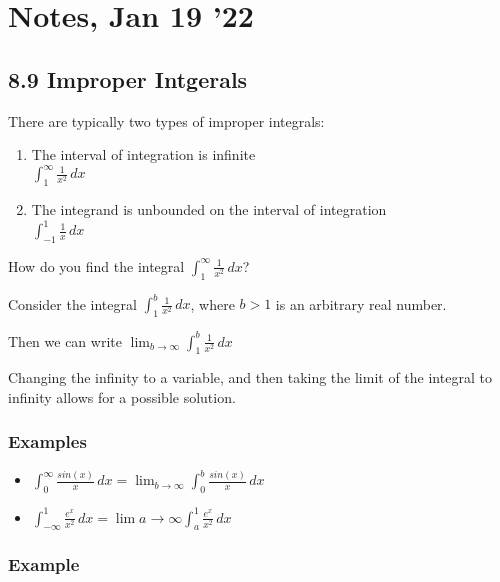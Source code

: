 \documentclass[12pt]{article}
\begin{document}
\section*{Notes, Jan 19 '22}

\subsection*{8.9 Improper Intgerals}

There are typically two types of improper integrals:

\begin{enumerate}

    \item The interval of integration is infinite \\
    $ \int_{1}^{\infty} \frac{1}{x^2} \,dx $

    \item The integrand is unbounded on the interval of integration \\
    $ \int_{-1}^{1} \frac{1}{x} \,dx $

\end{enumerate}

How do you find the integral $\int_{1}^{\infty} \frac{1}{x^2} \,dx$?

Consider the integral $\int_{1}^{b} \frac{1}{x^2} \,dx$, where $b > 1$ is an arbitrary real number.

Then we can write $\lim_{b\to\infty} \int_{1}^{b} \frac{1}{x^2} \,dx $

Changing the infinity to a variable, and then taking the limit of the integral to infinity allows for a possible solution.

\subsubsection*{Examples}

\begin{itemize}

    \item $ \int_{0}^{\infty} \frac{sin(x)}{x} \,dx = \lim_{b\to\infty} \int_{0}^{b} \frac{sin(x)}{x} \,dx $

    \item $ \int_{-\infty}^{1} \frac{e^x}{x^2} \,dx = \lim{a\to\infty} \int_{a}^{1} \frac{e^x}{x^2} \,dx $

\end{itemize}


\subsubsection*{Example}
\end{document}
